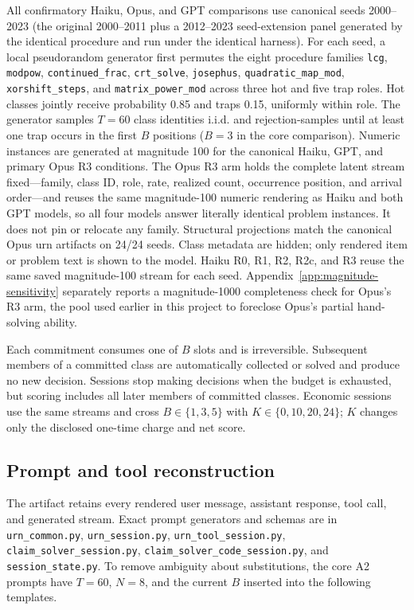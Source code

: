 \documentclass{article}
\begin{document}
All confirmatory Haiku, Opus, and GPT comparisons use canonical seeds
2000--2023 (the original 2000--2011 plus a 2012--2023 seed-extension panel
generated by the identical procedure and run under the identical harness). For each seed, a local pseudorandom generator first permutes the
eight procedure families
\texttt{lcg}, \texttt{modpow}, \texttt{continued\_frac},
\texttt{crt\_solve}, \texttt{josephus}, \texttt{quadratic\_map\_mod},
\texttt{xorshift\_steps}, and \texttt{matrix\_power\_mod} across three hot and
five trap roles. Hot classes jointly receive probability 0.85 and traps 0.15,
uniformly within role. The generator samples $T=60$ class identities
i.i.d. and rejection-samples until at least one trap occurs in the first $B$
positions ($B=3$ in the core comparison). Numeric instances are generated at
magnitude 100 for the canonical Haiku, GPT, and primary Opus R3 conditions. The
Opus R3 arm holds the complete latent stream fixed---family, class ID, role,
rate, realized count, occurrence position, and arrival order---and reuses the
same magnitude-100 numeric rendering as Haiku and both GPT models, so all four
models answer literally identical problem instances. It does not pin or
relocate any family. Structural projections match the canonical Opus urn
artifacts on 24/24 seeds. Class metadata are hidden; only rendered item or
problem text is shown to the model. Haiku R0, R1, R2, R2c, and R3 reuse the
same saved magnitude-100 stream for each seed. Appendix~\ref{app:magnitude-sensitivity}
separately reports a magnitude-1000 completeness check for Opus's R3 arm, the
pool used earlier in this project to foreclose Opus's partial hand-solving
ability.

Each commitment consumes one of $B$ slots and is irreversible. Subsequent
members of a committed class are automatically collected or solved and produce
no new decision. Sessions stop making decisions when the budget is exhausted,
but scoring includes all later members of committed classes. Economic sessions
use the same streams and cross $B\in\{1,3,5\}$ with
$K\in\{0,10,20,24\}$; $K$ changes only the disclosed one-time charge and net
score.

\subsection{Prompt and tool reconstruction}

The artifact retains every rendered user message, assistant response, tool
call, and generated stream. Exact prompt generators and schemas are in
\texttt{urn\_common.py}, \texttt{urn\_session.py},
\texttt{urn\_tool\_session.py}, \texttt{claim\_solver\_session.py},
\texttt{claim\_solver\_code\_session.py}, and
\texttt{session\_state.py}. To remove ambiguity about substitutions, the core
A2 prompts have $T=60$, $N=8$, and the current $B$ inserted into the following
templates.
\end{document}
